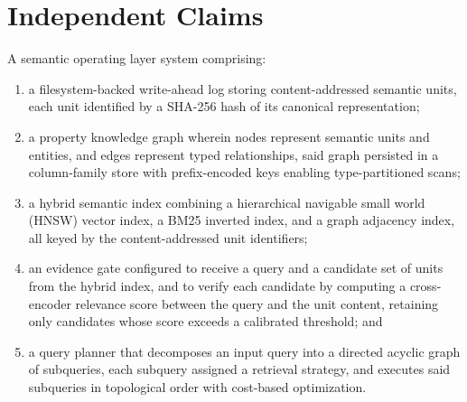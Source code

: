 \section{Independent Claims}
\label{sec:patent:independent}

\begin{claim}
\label{claim:system}
A semantic operating layer system comprising:
\begin{enumerate}
  \item a filesystem-backed write-ahead log storing content-addressed semantic units, each unit identified by a SHA-256 hash of its canonical representation;
  \item a property knowledge graph wherein nodes represent semantic units and entities, and edges represent typed relationships, said graph persisted in a column-family store with prefix-encoded keys enabling type-partitioned scans;
  \item a hybrid semantic index combining a hierarchical navigable small world (HNSW) vector index, a BM25 inverted index, and a graph adjacency index, all keyed by the content-addressed unit identifiers;
  \item an evidence gate configured to receive a query and a candidate set of units from the hybrid index, and to verify each candidate by computing a cross-encoder relevance score between the query and the unit content, retaining only candidates whose score exceeds a calibrated threshold; and
  \item a query planner that decomposes an input query into a directed acyclic graph of subqueries, each subquery assigned a retrieval strategy, and executes said subqueries in topological order with cost-based optimization.
\end{enumerate}
\end{claim}

